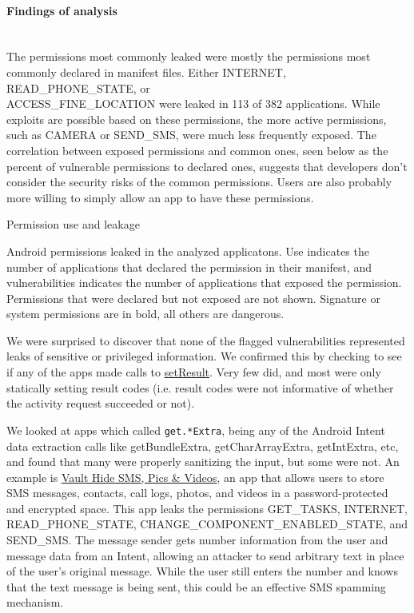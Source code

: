\documentclass[12pt,a4paper]{article}
\begin{document}
\paragraph{Findings of analysis} ~\\
The permissions most commonly leaked were mostly the permissions most commonly
declared in manifest files. Either INTERNET, READ\_PHONE\_STATE, or\\
ACCESS\_FINE\_LOCATION were leaked in 113 of 382 applications. While exploits
are possible based on these permissions, the more active permissions, such as
CAMERA or SEND\_SMS, were much less frequently exposed. The correlation between
exposed permissions and common ones, seen below as the percent of vulnerable
permissions to declared ones, suggests that developers don't consider the
security risks of the common permissions. Users are also probably more willing
to simply allow an app to have these permissions.
\begin{table}
\caption{Permission use and leakage}

\caption*{Android permissions leaked in the analyzed applicatons. Use indicates
  the number of applications that declared the permission in their
  manifest, and vulnerabilities indicates the number of applications that
  exposed the permission.  Permissions that were declared but not exposed
  are not shown. Signature or system permissions are in bold, all others
  are dangerous.}
\end{table}

We were surprised to discover that none of the flagged vulnerabilities
represented leaks of sensitive or privileged information. We confirmed this by
checking to see if any of the apps made calls to
\href{https://developer.android.com/reference/android/app/Activity.html#setResult\%28int\%29}{setResult}. Very
few did, and most were only statically setting result codes (i.e. result codes
were not informative of whether the activity request succeeded or not).

We looked at apps which called \texttt{get.*Extra}, being any of the Android
Intent data extraction calls like getBundleExtra, getCharArrayExtra,
getIntExtra, etc, and found that many were properly sanitizing the input, but
some were not. An example is
\href{https://play.google.com/store/apps/details?id=com.netqin.ps\&feature=search\_result#?t=W251bGwsMSwxLDEsImNvbS5uZXRxaW4ucHMiXQ..}{Vault
Hide SMS, Pics \& Videos}, an app that allows users to store SMS messages,
contacts, call logs, photos, and videos in a password-protected and encrypted
space. This app leaks the permissions GET\_TASKS, INTERNET, READ\_PHONE\_STATE,
CHANGE\_COMPONENT\_ENABLED\_STATE, and SEND\_SMS. The message sender gets number
information from the user and message data from an Intent, allowing an attacker
to send arbitrary text in place of the user's original message. While the user
still enters the number and knows that the text message is being sent, this
could be an effective SMS spamming mechanism.
\end{document}
